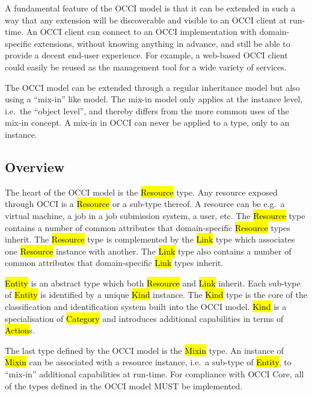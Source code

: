 \documentclass[10pt,a4paper,british]{article}
\begin{document}
A fundamental feature of the OCCI model is that it can be extended in such a
way that any extension will be discoverable and visible to an OCCI client at
run-time. An OCCI client can connect to an OCCI implementation with
domain-specific extensions, without knowing anything in advance, and still be
able to provide a decent end-user experience. For example, a web-based OCCI
client could easily be reused as the management tool for a wide variety of
services.

The OCCI model can be extended through a regular inheritance model but also
using a ``mix-in'' like model. The mix-in model only applies at the instance
level, i.e.~the ``object level'', and thereby differs from the more common uses
of the mix-in concept. A mix-in in OCCI can never be applied to a type, only to
an instance.

\subsection{Overview}

The heart of the OCCI model is the \hl{Resource} type. Any resource exposed
through OCCI is a \hl{Resource} or a sub-type thereof.
A resource can be e.g.~a virtual machine, a job in a job submission system, a
user, etc.
%
The \hl{Resource} type contains a number of common attributes that
domain-specific \hl{Resource} types inherit. The \hl{Resource} type is
complemented by the \hl{Link} type which associates one \hl{Resource} instance
with another.
%
The \hl{Link} type also contains a number of common attributes that
domain-specific \hl{Link} types inherit.

\hl{Entity} is an abstract type which both \hl{Resource} and \hl{Link} inherit.
Each sub-type of \hl{Entity} is identified by a unique \hl{Kind} instance.
%
The \hl{Kind} type is the core of the classification and identification
system built into the OCCI model. \hl{Kind} is a specialisation of
\hl{Category} and introduces additional capabilities in terms of \hl{Action}s.

The last type defined by the OCCI model is the \hl{Mixin} type. An instance of
\hl{Mixin} can be associated with a resource instance, i.e.~a sub-type of
\hl{Entity}, to ``mix-in'' additional capabilities at run-time.
%
For compliance with OCCI Core, all of the types defined in the OCCI model MUST
be implemented.
\end{document}
